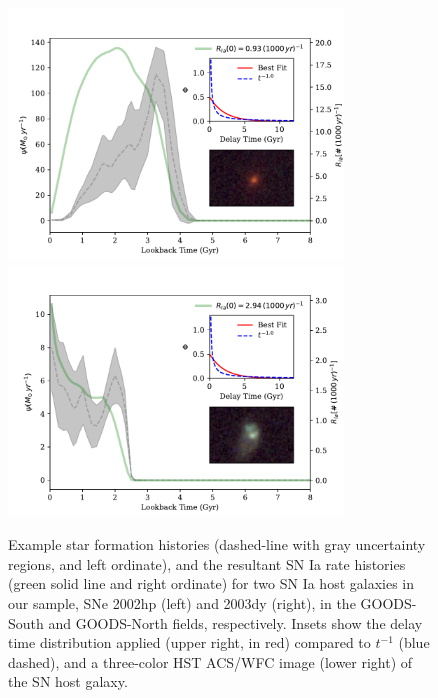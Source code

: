 \documentclass[apj, twocolumn]{aastex62}
\begin{document}
\begin{figure}[t] 
   \includegraphics[width=3.5in]{figure_sfh_demo_v1.pdf} 
   \includegraphics[width=3.5in]{figure_sfh_demo_v2.pdf} 
   \caption{\footnotesize Example star formation histories (dashed-line with gray uncertainty regions, and left ordinate), and the resultant SN Ia rate histories (green solid line and right ordinate) for two SN Ia host galaxies in our sample, SNe 2002hp (left) and 2003dy (right), in the GOODS-South and GOODS-North fields, respectively. Insets show the delay time distribution applied (upper right, in red) compared to $t^{-1}$ (blue dashed), and a three-color HST ACS/WFC image (lower right) of the SN host galaxy.}
   \label{fig:figure_sfh_fit_demo}
\end{figure}
\end{document}
